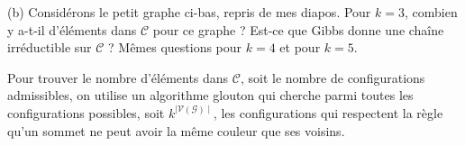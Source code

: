 \documentclass{article}
\begin{document}
\vspace{.5cm}
\noindent (b) Considérons le petit graphe ci-bas, repris de mes diapos.
Pour $k=3$, combien y a-t-il d'éléments dans $\mathcal{C}$ pour ce 
graphe ? Est-ce que Gibbs donne une chaîne irréductible sur 
$\mathcal{C}$ ? Mêmes questions pour $k=4$ et pour $k=5$.
\begin{figure}[h]
    \centering
\end{figure}

Pour trouver le nombre d'éléments dans $\mathcal{C}$, soit
le nombre de configurations admissibles, on utilise un
algorithme glouton qui cherche parmi toutes les configurations
possibles, soit $k^{\mid\mathcal{V}(\mathcal{G})\mid}$, les
configurations qui respectent la règle qu'un sommet ne peut
avoir la même couleur que ses voisins.
\end{document}
